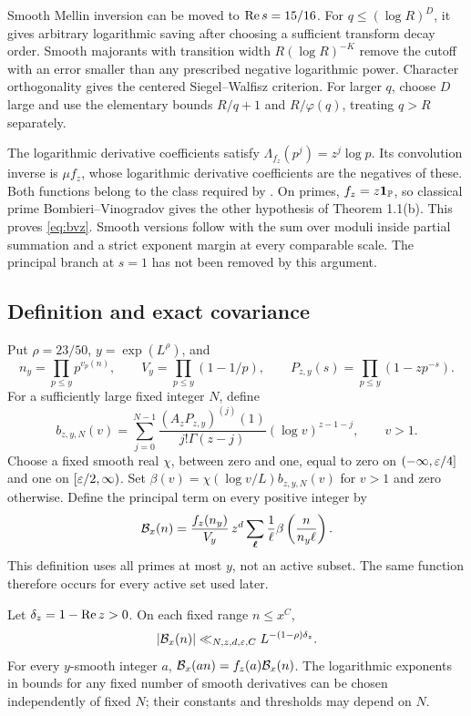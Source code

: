 Smooth Mellin inversion can be moved to $\operatorname{Re} s=15/16$. For
$q\leq(\log R)^D$, it gives arbitrary logarithmic saving after
choosing a sufficient transform decay order. Smooth majorants with
transition width $R(\log R)^{-K}$ remove the cutoff with an error
smaller than any prescribed negative logarithmic power. Character
orthogonality gives the centered Siegel--Walfisz criterion.
For larger $q$, choose $D$ large and use the elementary bounds
$R/q+1$ and $R/\varphi(q)$, treating $q>R$ separately.

The logarithmic derivative coefficients satisfy
$\Lambda_{f_z}(p^j)=z^j\log p$. Its convolution inverse is
$\mu f_z$, whose logarithmic derivative coefficients are the negatives
of these. Both functions belong to the class required by
\cite{GS}. On primes, $f_z=z\mathbf 1_{\mathbb P}$, so classical prime
Bombieri--Vinogradov gives the other hypothesis of Theorem 1.1(b).
This proves \eqref{eq:bvz}. Smooth versions follow with the sum over
moduli inside partial summation and a strict exponent margin at
every comparable scale. The principal branch at $s=1$ has not been
removed by this argument.

\subsection{Definition and exact covariance}

Put $\rho=23/50$, $y=\exp(L^\rho)$, and
\[
 n_y=\prod_{p\leq y}p^{v_p(n)},\qquad
 V_y=\prod_{p\leq y}(1-1/p),\qquad
 P_{z,y}(s)=\prod_{p\leq y}(1-zp^{-s}).
\]
For a sufficiently large fixed integer $N$, define
\begin{equation}\label{eq:density}
 b_{z,y,N}(v)=\sum_{j=0}^{N-1}
 \frac{(A_zP_{z,y})^{(j)}(1)}{j!\Gamma(z-j)}
          (\log v)^{z-1-j},\qquad v>1.
\end{equation}
Choose a fixed smooth real $\chi$, between zero and one, equal to
zero on $(-\infty,\varepsilon/4]$ and one on $[\varepsilon/2,\infty)$.
Set $\beta(v)=\chi(\log v/L)b_{z,y,N}(v)$ for $v>1$ and zero
otherwise. Define the principal term on every positive integer by
\begin{equation}\label{eq:model}
 \mathcal B_x(n)=\frac{f_z(n_y)}{V_y}\,z^d
       \sum_{\boldsymbol\ell}\frac1\ell
          \beta\left(\frac{n}{n_y\ell}\right).
\end{equation}
This definition uses all primes at most $y$, not an active subset.
The same function therefore occurs for every active set used later.

\begin{lemma}\label{lem:modelsize}
Let $\delta_z=1-\operatorname{Re} z>0$. On each fixed range $n\leq x^C$,
\begin{equation}\label{eq:modelsize}
 |\mathcal B_x(n)|\ll_{N,z,d,\varepsilon,C}L^{-(1-\rho)\delta_z}.
\end{equation}
For every $y$-smooth integer $a$,
$\mathcal B_x(an)=f_z(a)\mathcal B_x(n)$. The logarithmic exponents in bounds for
any fixed number of smooth derivatives can be chosen independently
of fixed $N$; their constants and thresholds may depend on $N$.
\end{lemma}

